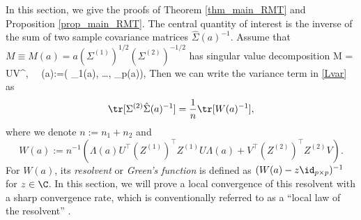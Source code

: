 \documentclass[aos,preprint]{imsart}
\begin{document}
In this section, we give the proofs of Theorem \ref{thm_main_RMT} and Proposition \ref{prop_main_RMT}. The central quantity of interest is the inverse of the sum of two sample covariance matrices $\hat \Sigma(a)^{-1}$. Assume that $M\equiv M(a)=a(\Sigma^{(1)})^{1/2}(\Sigma^{(2)})^{-1/2}$ has singular value decomposition
\be\label{eigen2}
M = U\Lambda V^\top, \quad {} \ \ \Lambda\equiv \Lambda (a):=( \lambda_1(a), \ldots, \lambda_p(a)),
\ee 
Then we can write the variance term in \eqref{Lvar} as
\begin{align}\label{eigen2extra}
\tr[\Sigma^{(2)} \hat{\Sigma}(a)^{-1}]= \frac1n \tr[W(a)^{-1}],
\end{align}
where we denote $n:=n_1+n_2$ and
$$ W(a):=n^{-1}\left( \Lambda(a) U^\top (Z^{(1)})^\top Z^{(1)} U\Lambda(a)  + V^\top (Z^{(2)})^\top Z^{(2)}V\right).$$
For $W(a)$, its \emph{resolvent} or \emph{Green's function} is defined as $(W(a) - z\id_{p\times p})^{-1}$ for $z\in \C$.
In this section, we will prove a local convergence of this resolvent with a sharp convergence rate, which is conventionally referred to as a ``local law of the resolvent''  \cite{isotropic,erdos2017dynamical,Anisotropic}.
\end{document}
